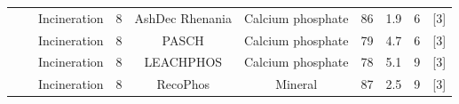 \documentclass[]{elsarticle}
\begin{document}
\begin{table}
{\begin{threeparttable}
\begin{tabular}{@{}cccccccccc@{}}
				&                                                                                                                                                         & Incineration                                                                     & 8                                      & AshDec Rhenania                                                                          & Calcium phosphate                                                                 & 86                                                                                    & 1.9                                  & 6                                                            &     [3]     \\
				&                                                                                                                                                         & Incineration                                                                     & 8                                      & PASCH                                                                                    & Calcium phosphate                                                                 & 79                                                                                    & 4.7                                  & 6                                                            &     [3]     \\
				&                                                                                                                                                         & Incineration                                                                     & 8                                      & LEACHPHOS                                                                                & Calcium phosphate                                                                 & 78                                                                                    & 5.1                                  & 9                                                            &     [3]     \\
				&                                                                                                                                                         & Incineration                                                                     & 8                                      & RecoPhos                                                                                 & Mineral                                                                           & 87                                                                                    & 2.5                                  & 9                                                            &      [3]    \\

\end{tabular}
\end{threeparttable}}
\end{table}
\end{document}
